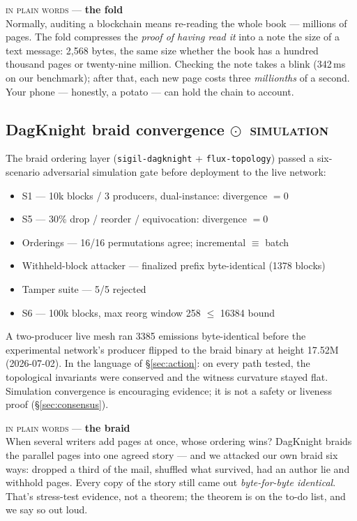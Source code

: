 \documentclass[10pt,a4paper]{article}
\newcommand{\stS}{\textcolor{sigilblue}{$\odot$}~{\scriptsize\textcolor{sigilblue}{\textsc{simulation}}}}
\newcommand{\ckdone}{\makebox[1.4em][l]{\rlap{\hspace{0.2em}\raisebox{0.15ex}{\textcolor{sigilcyan}{$\checkmark$}}}$\square$}}
\newcommand{\layman}[3]{%
\begin{tcolorbox}[enhanced,
  interior style={left color=#1!9,right color=white},
  colframe=#1!45!slate,boxrule=0.5pt,arc=3pt,
  borderline west={2.5pt}{0pt}{#1},
  left=9pt,right=9pt,top=7pt,bottom=7pt]
{\scriptsize\textcolor{#1}{\textsc{in plain words}}\; — \;\textbf{\small #2}}\\[3pt]
\small #3
\end{tcolorbox}}
\begin{document}
\layman{sigilcyan}{the fold}{Normally, auditing a blockchain means re-reading the whole
book — millions of pages. The fold compresses the \emph{proof of having read it} into a
note the size of a text message: 2{,}568 bytes, the same size whether the book has a
hundred thousand pages or twenty-nine million. Checking the note takes a blink (342\,ms
on our benchmark); after that, each new page costs three \emph{millionths} of a second.
Your phone — honestly, a potato — can hold the chain to account.}

\subsection{DagKnight braid convergence \hfill \stS}\label{sec:dagknight}

The braid ordering layer (\texttt{sigil-dagknight} + \texttt{flux-topology}) passed a
six-scenario adversarial simulation gate before deployment to the live network:

\begin{itemize}[leftmargin=1.5em,itemsep=2pt,label={}]
\item \ckdone S1 — 10k blocks / 3 producers, dual-instance: divergence $=0$
\item \ckdone S5 — 30\% drop / reorder / equivocation: divergence $=0$
\item \ckdone Orderings — 16/16 permutations agree; incremental $\equiv$ batch
\item \ckdone Withheld-block attacker — finalized prefix byte-identical (1378 blocks)
\item \ckdone Tamper suite — 5/5 rejected
\item \ckdone S6 — 100k blocks, max reorg window 258 $\le$ 16384 bound
\end{itemize}

A two-producer live mesh ran 3385 emissions byte-identical before the experimental
network's producer flipped to the braid binary at height 17.52M (2026-07-02). In the
language of \S\ref{sec:action}: on every path tested, the topological invariants were
conserved and the witness curvature stayed flat. Simulation convergence is encouraging
evidence; it is not a safety or liveness proof (\S\ref{sec:consensus}).

\layman{sigilblue}{the braid}{When several writers add pages at once, whose ordering
wins? DagKnight braids the parallel pages into one agreed story — and we attacked our
own braid six ways: dropped a third of the mail, shuffled what survived, had an author
lie and withhold pages. Every copy of the story still came out \emph{byte-for-byte
identical}. That's stress-test evidence, not a theorem; the theorem is on the to-do
list, and we say so out loud.}
\end{document}

